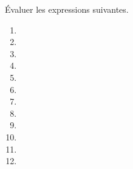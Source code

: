 \'Evaluer les expressions suivantes.
\begin{multicols}{2}
  \begin{enumerate}[label=\emph{\alph*)}]
    \item {}
    \item {}
    \item {}
    \item {}
    \item {}
    \item {}
    \item {}
    \item {}
    \item {}
    \item {}
    \item {}
    \item {}
  \end{enumerate}
\end{multicols}